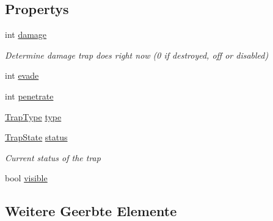 \subsection*{Propertys}
\begin{DoxyCompactItemize}
\item 
int \hyperlink{class_gruppe22_1_1_backend_1_1_trap_tile_a271126192b9b8fb95eb929a581375258}{damage}
\begin{DoxyCompactList}\small\item\em Determine damage trap does right now (0 if destroyed, off or disabled) \end{DoxyCompactList}\item 
int \hyperlink{class_gruppe22_1_1_backend_1_1_trap_tile_a04ee490b767680e638cc177c213d322e}{evade}
\item 
int \hyperlink{class_gruppe22_1_1_backend_1_1_trap_tile_a1d998440a070ca21b21803f653e23c8a}{penetrate}
\item 
\hyperlink{namespace_gruppe22_1_1_backend_a7cb5b89ab1a55788a8025add98954b53}{Trap\-Type} \hyperlink{class_gruppe22_1_1_backend_1_1_trap_tile_aca739cc12c54484bad034479e2ca6e71}{type}
\item 
\hyperlink{namespace_gruppe22_1_1_backend_a3441a72488409f943181b735fcab76eb}{Trap\-State} \hyperlink{class_gruppe22_1_1_backend_1_1_trap_tile_a503c06f82de3c82ec940c2fb1ed27ed7}{status}
\begin{DoxyCompactList}\small\item\em Current status of the trap \end{DoxyCompactList}\item 
bool \hyperlink{class_gruppe22_1_1_backend_1_1_trap_tile_af1ebd53e3386f0edbed814e5beb10509}{visible}
\end{DoxyCompactItemize}
\subsection*{Weitere Geerbte Elemente}


